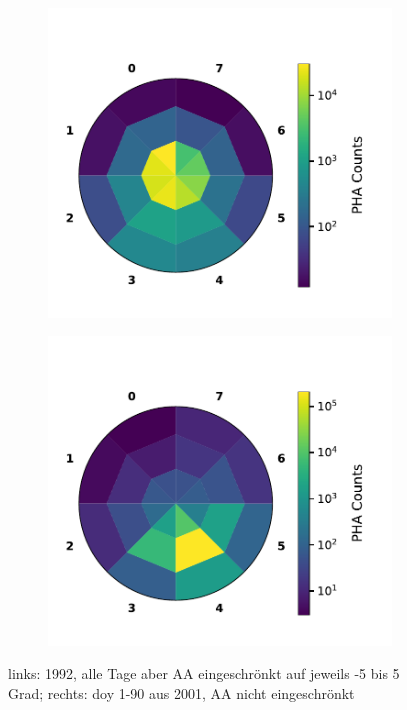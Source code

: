 \begin{figure}
	\centering
	\begin{subfigure}{.5\textwidth}
		\centering
		\includegraphics[width=1\textwidth]{Figures/hist_sec_det_noaa.pdf}
	\end{subfigure}%
	\begin{subfigure}{.5\textwidth}
		\centering
		\includegraphics[width=1\textwidth]{Figures/hist_sec_det_aa.pdf}
	\end{subfigure}
	\caption{links: 1992, alle Tage aber AA eingeschrönkt auf jeweils -5 bis 5 Grad; rechts: doy 1-90 aus 2001, AA nicht eingeschrönkt}
\label{fig:histdetsecaa}
\end{figure}




